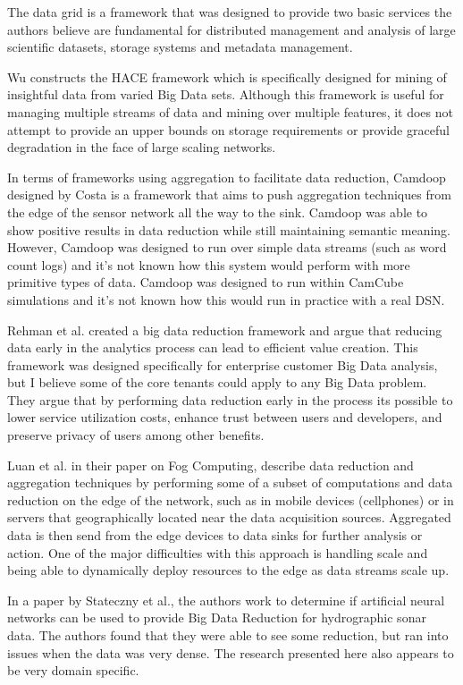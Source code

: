 The data grid\cite{chervenak2000data} is a framework that was designed to provide two basic services the authors believe are fundamental for distributed management and analysis of large scientific datasets, storage systems and metadata management.

Wu\cite{wu2014data} constructs the HACE framework which is specifically designed for mining of insightful data from varied Big Data sets. Although this framework is useful for managing multiple streams of data and mining over multiple features, it does not attempt to provide an upper bounds on storage requirements or provide graceful degradation in the face of large scaling networks.

In terms of frameworks using aggregation to facilitate data reduction, Camdoop designed by Costa\cite{costa2012camdoop} is a framework that aims to push aggregation techniques from the edge of the sensor network all the way to the sink. Camdoop was able to show positive results in data reduction while still maintaining semantic meaning. However, Camdoop was designed to run over simple data streams (such as word count logs) and it's not known how this system would perform with more primitive types of data. Camdoop was designed to run within CamCube simulations and it's not known how this would run in practice with a real DSN.

Rehman et al.\cite{ur2016big} created a big data reduction framework and argue that reducing data early in the analytics process can lead to efficient value creation. This framework was designed specifically for enterprise customer Big Data analysis, but I believe some of the core tenants could apply to any Big Data problem. They argue that by performing data reduction early in the process its possible to lower service utilization costs, enhance trust between users and developers, and preserve privacy of users among other benefits.

Luan et al.\cite{luan2015fog} in their paper on Fog Computing, describe data reduction and aggregation techniques by performing some of a subset of computations and data reduction on the edge of the network, such as in mobile devices (cellphones) or in servers that geographically located near the data acquisition sources. Aggregated data is then send from the edge devices to data sinks for further analysis or action. One of the major difficulties with this approach is handling scale and being able to dynamically deploy resources to the edge as data streams scale up.

In a paper by Stateczny et al.\cite{stateczny2014self}, the authors work to determine if artificial neural networks can be used to provide Big Data Reduction for hydrographic sonar data. The authors found that they were able to see some reduction, but ran into issues when the data was very dense. The research presented here also appears to be very domain specific.

